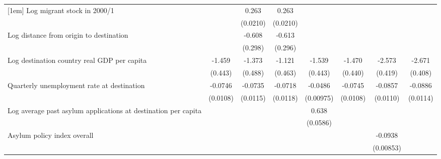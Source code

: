 \begin{table}[htbp]
\begin{tabular}{l*{7}{c}}
[1em]
Log migrant stock in 2000/1&                     &       0.263\sym{***}&       0.263\sym{***}&                     &                     &                     &                     \\
                    &                     &    (0.0210)         &    (0.0210)         &                     &                     &                     &                     \\
[1em]
Log distance from origin to destination&                     &      -0.608\sym{*}  &      -0.613\sym{*}  &                     &                     &                     &                     \\
                    &                     &     (0.298)         &     (0.296)         &                     &                     &                     &                     \\
[1em]
Log destination country real GDP per capita&      -1.459\sym{**} &      -1.373\sym{**} &      -1.121\sym{*}  &      -1.539\sym{**} &      -1.470\sym{**} &      -2.573\sym{***}&      -2.671\sym{***}\\
                    &     (0.443)         &     (0.488)         &     (0.463)         &     (0.443)         &     (0.440)         &     (0.419)         &     (0.408)         \\
[1em]
Quarterly unemployment rate at destination&     -0.0746\sym{***}&     -0.0735\sym{***}&     -0.0718\sym{***}&     -0.0486\sym{***}&     -0.0745\sym{***}&     -0.0857\sym{***}&     -0.0886\sym{***}\\
                    &    (0.0108)         &    (0.0115)         &    (0.0118)         &   (0.00975)         &    (0.0108)         &    (0.0110)         &    (0.0114)         \\
[1em]
Log average past asylum applications at destination per capita&                     &                     &                     &       0.638\sym{***}&                     &                     &                     \\
                    &                     &                     &                     &    (0.0586)         &                     &                     &                     \\
[1em]
Asylum policy index overall&                     &                     &                     &                     &                     &     -0.0938\sym{***}&                     \\
                    &                     &                     &                     &                     &                     &   (0.00853)         &                     \\

\end{tabular}
\end{table}
